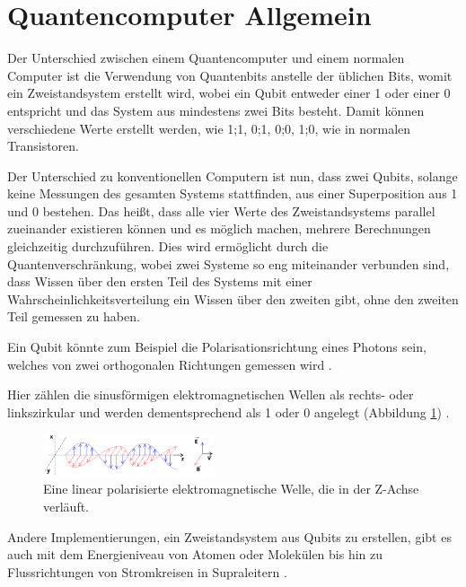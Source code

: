 \section{Quantencomputer Allgemein}
\label{sec:quantencomputer}
Der Unterschied zwischen einem Quantencomputer und einem normalen Computer ist die Verwendung von Quantenbits \cite{quantencomputer_2024} anstelle der üblichen Bits, womit ein Zweistandsystem \cite{zweizustandssystem_nodate} erstellt wird, wobei ein Qubit entweder einer 1 oder einer 0 entspricht und das System aus mindestens zwei Bits besteht. Damit können verschiedene Werte erstellt werden, wie 1;1, 0;1, 0;0, 1;0, wie in normalen Transistoren.

Der Unterschied zu konventionellen Computern ist nun, dass zwei Qubits, solange keine Messungen des gesamten Systems stattfinden, aus einer Superposition aus 1 und 0 bestehen. 
Das heißt, dass alle vier Werte des Zweistandsystems parallel zueinander existieren können und es möglich machen, mehrere Berechnungen gleichzeitig durchzuführen.\cite{What_is_quantum_computing_nodate}
Dies wird ermöglicht durch die Quantenverschränkung, wobei zwei Systeme so eng miteinander verbunden sind, dass Wissen über den ersten Teil des Systems mit einer Wahrscheinlichkeitsverteilung ein Wissen über den zweiten gibt, ohne den zweiten Teil gemessen zu haben.\cite{quantenverschrankung_2024}

Ein Qubit könnte zum Beispiel die Polarisationsrichtung eines Photons sein, welches von zwei orthogonalen Richtungen gemessen wird \cite{What_is_quantum_computing_nodate}. 

Hier zählen die sinusförmigen elektromagnetischen Wellen als rechts- 
oder linkszirkular und werden dementsprechend als 1 oder 0 angelegt (Abbildung \ref{fig:elektromagnetische_welle}) \cite{electromagnetic_2024}.

\begin{figure}[h]
    \centering
    \includegraphics[width=0.45\textwidth]{Onde_electromagnetique.svg.jpg}
    \caption{Eine linear polarisierte elektromagnetische Welle, die in der Z-Achse verläuft.}
    \label{fig:elektromagnetische_welle}
\end{figure}


Andere Implementierungen, ein Zweistandsystem aus Qubits zu erstellen, gibt es auch mit dem Energieniveau von Atomen oder Molekülen bis hin zu Flussrichtungen von Stromkreisen in Supraleitern \cite{supraleitung_nodate}.

